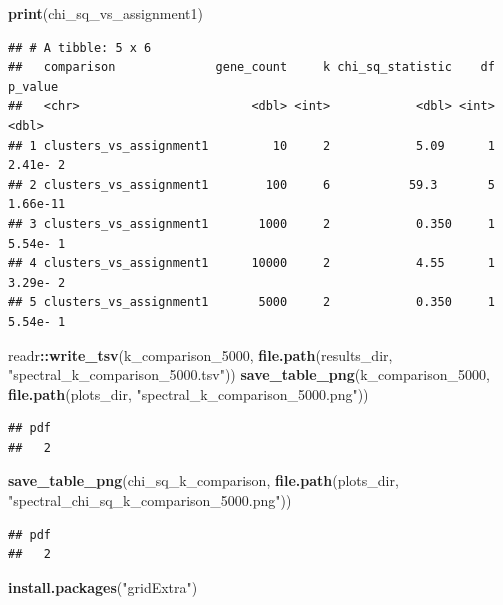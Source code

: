 \documentclass[
]{article}
\newenvironment{Shaded}{\begin{snugshade}}{\end{snugshade}}
\newcommand{\FunctionTok}[1]{\textcolor[rgb]{0.13,0.29,0.53}{\textbf{#1}}}
\newcommand{\NormalTok}[1]{#1}
\newcommand{\SpecialCharTok}[1]{\textcolor[rgb]{0.81,0.36,0.00}{\textbf{#1}}}
\newcommand{\StringTok}[1]{\textcolor[rgb]{0.31,0.60,0.02}{#1}}
\begin{document}
\begin{Shaded}
\begin{Highlighting}[]
\FunctionTok{print}\NormalTok{(chi\_sq\_vs\_assignment1)}
\end{Highlighting}
\end{Shaded}

\begin{verbatim}
## # A tibble: 5 x 6
##   comparison              gene_count     k chi_sq_statistic    df  p_value
##   <chr>                        <dbl> <int>            <dbl> <int>    <dbl>
## 1 clusters_vs_assignment1         10     2            5.09      1 2.41e- 2
## 2 clusters_vs_assignment1        100     6           59.3       5 1.66e-11
## 3 clusters_vs_assignment1       1000     2            0.350     1 5.54e- 1
## 4 clusters_vs_assignment1      10000     2            4.55      1 3.29e- 2
## 5 clusters_vs_assignment1       5000     2            0.350     1 5.54e- 1
\end{verbatim}

\begin{Shaded}
\begin{Highlighting}[]
\NormalTok{readr}\SpecialCharTok{::}\FunctionTok{write\_tsv}\NormalTok{(k\_comparison\_5000, }\FunctionTok{file.path}\NormalTok{(results\_dir, }\StringTok{"spectral\_k\_comparison\_5000.tsv"}\NormalTok{))}
\FunctionTok{save\_table\_png}\NormalTok{(k\_comparison\_5000, }\FunctionTok{file.path}\NormalTok{(plots\_dir, }\StringTok{"spectral\_k\_comparison\_5000.png"}\NormalTok{))}
\end{Highlighting}
\end{Shaded}

\begin{verbatim}
## pdf 
##   2
\end{verbatim}

\begin{Shaded}
\begin{Highlighting}[]
\FunctionTok{save\_table\_png}\NormalTok{(chi\_sq\_k\_comparison, }\FunctionTok{file.path}\NormalTok{(plots\_dir, }\StringTok{"spectral\_chi\_sq\_k\_comparison\_5000.png"}\NormalTok{))}
\end{Highlighting}
\end{Shaded}

\begin{verbatim}
## pdf 
##   2
\end{verbatim}

\begin{Shaded}
\begin{Highlighting}[]
\FunctionTok{install.packages}\NormalTok{(}\StringTok{"gridExtra"}\NormalTok{)}
\end{Highlighting}
\end{Shaded}
\end{document}
